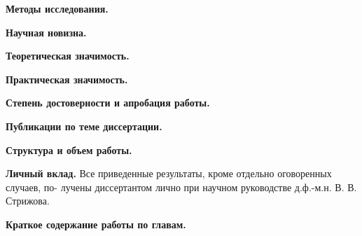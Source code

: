 \vspace{0.5cm}
\textbf{Методы исследования.}

\vspace{0.5cm}
\textbf{Научная новизна.}

\vspace{0.5cm}
\textbf{Теоретическая значимость.}

\vspace{0.5cm}
\textbf{Практическая значимость.}

\vspace{0.5cm}
\textbf{Степень достоверности и апробация работы.}

\vspace{0.5cm}
\textbf{Публикации по теме диссертации.}

\vspace{0.5cm}
\textbf{Структура и объем работы.}

\vspace{0.5cm}
\textbf{Личный вклад.}
Все приведенные результаты, кроме отдельно оговоренных случаев, по- лучены диссертантом лично при научном руководстве д.ф.-м.н. В. В. Стрижова.

\vspace{0.5cm}
\textbf{Краткое содержание работы по главам.}